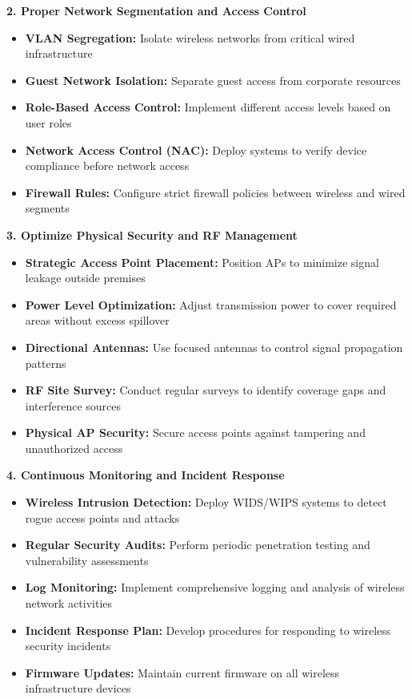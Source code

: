 \documentclass[12pt,a4paper]{article}
\begin{document}
\textbf{2. Proper Network Segmentation and Access Control}
\begin{itemize}
    \item \textbf{VLAN Segregation:} Isolate wireless networks from critical wired infrastructure
    \item \textbf{Guest Network Isolation:} Separate guest access from corporate resources
    \item \textbf{Role-Based Access Control:} Implement different access levels based on user roles
    \item \textbf{Network Access Control (NAC):} Deploy systems to verify device compliance before network access
    \item \textbf{Firewall Rules:} Configure strict firewall policies between wireless and wired segments
\end{itemize}

\textbf{3. Optimize Physical Security and RF Management}
\begin{itemize}
    \item \textbf{Strategic Access Point Placement:} Position APs to minimize signal leakage outside premises
    \item \textbf{Power Level Optimization:} Adjust transmission power to cover required areas without excess spillover
    \item \textbf{Directional Antennas:} Use focused antennas to control signal propagation patterns
    \item \textbf{RF Site Survey:} Conduct regular surveys to identify coverage gaps and interference sources
    \item \textbf{Physical AP Security:} Secure access points against tampering and unauthorized access
\end{itemize}

\textbf{4. Continuous Monitoring and Incident Response}
\begin{itemize}
    \item \textbf{Wireless Intrusion Detection:} Deploy WIDS/WIPS systems to detect rogue access points and attacks
    \item \textbf{Regular Security Audits:} Perform periodic penetration testing and vulnerability assessments
    \item \textbf{Log Monitoring:} Implement comprehensive logging and analysis of wireless network activities
    \item \textbf{Incident Response Plan:} Develop procedures for responding to wireless security incidents
    \item \textbf{Firmware Updates:} Maintain current firmware on all wireless infrastructure devices
\end{itemize}
\end{document}
